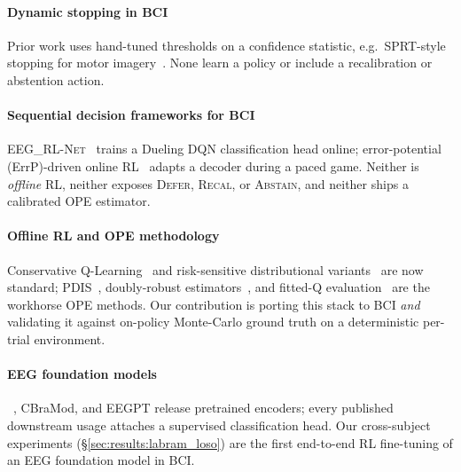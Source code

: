 
\paragraph*{Dynamic stopping in BCI}
Prior work uses hand-tuned thresholds on a confidence statistic,
e.g.\ SPRT-style stopping for motor
imagery~\cite{Liu2017MotorImageryBTSPRT}. None learn a policy or
include a recalibration or abstention action.

\paragraph*{Sequential decision frameworks for BCI}
\textsc{EEG\_RL-Net}~\cite{Aung2024EEG_RL_Net} trains a Dueling
DQN classification head online; error-potential (ErrP)-driven online
RL~\cite{Fidencio2025ErrPRL} adapts a decoder during a paced game.
Neither is \emph{offline} RL, neither exposes \textsc{Defer},
\textsc{Recal}, or \textsc{Abstain}, and neither ships a calibrated
OPE estimator.

\paragraph*{Offline RL and OPE methodology}
Conservative Q-Learning~\cite{Kumar2020CQL} and risk-sensitive
distributional variants~\cite{Dabney2018QR-DQN} are now standard;
PDIS~\cite{Precup2000PDIS}, doubly-robust
estimators~\cite{Jiang2016DR}, and fitted-Q
evaluation~\cite{Le2019BatchRL} are the workhorse OPE methods.
Our contribution is porting this stack to BCI \emph{and} validating
it against on-policy Monte-Carlo ground truth on a deterministic
per-trial environment.

\paragraph*{EEG foundation models}
\labram{}~\cite{LaBraM2024}, CBraMod, and EEGPT release pretrained
encoders; every published downstream usage attaches a supervised
classification head. Our cross-subject experiments
(\S\ref{sec:results:labram_loso}) are the first end-to-end RL
fine-tuning of an EEG foundation model in BCI.
